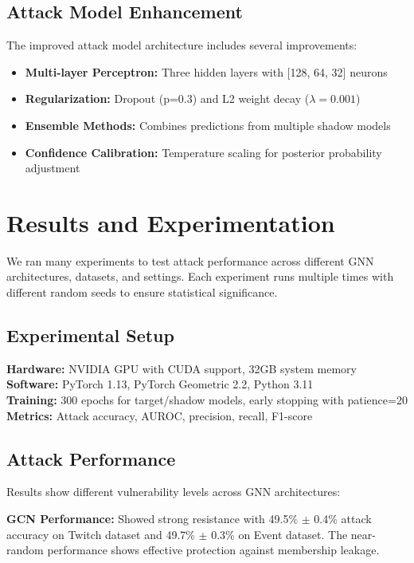 \documentclass{article}
\begin{document}
\subsection{Attack Model Enhancement}
The improved attack model architecture includes several improvements:

\begin{itemize}
\item \textbf{Multi-layer Perceptron:} Three hidden layers with [128, 64, 32] neurons
\item \textbf{Regularization:} Dropout (p=0.3) and L2 weight decay ($\lambda=0.001$)
\item \textbf{Ensemble Methods:} Combines predictions from multiple shadow models
\item \textbf{Confidence Calibration:} Temperature scaling for posterior probability adjustment
\end{itemize}

\section{Results and Experimentation}
\label{results}
We ran many experiments to test attack performance across different GNN architectures, datasets, and settings. Each experiment runs multiple times with different random seeds to ensure statistical significance.

\subsection{Experimental Setup}
\textbf{Hardware:} NVIDIA GPU with CUDA support, 32GB system memory\\
\textbf{Software:} PyTorch 1.13, PyTorch Geometric 2.2, Python 3.11\\
\textbf{Training:} 300 epochs for target/shadow models, early stopping with patience=20\\
\textbf{Metrics:} Attack accuracy, AUROC, precision, recall, F1-score

\subsection{Attack Performance}
Results show different vulnerability levels across GNN architectures:

\textbf{GCN Performance:} Showed strong resistance with 49.5\% $\pm$ 0.4\% attack accuracy on Twitch dataset and 49.7\% $\pm$ 0.3\% on Event dataset. The near-random performance shows effective protection against membership leakage.
\end{document}
